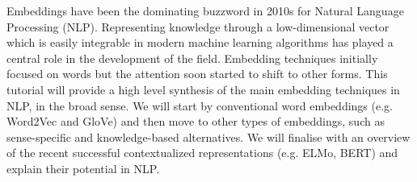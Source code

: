 Embeddings have been the dominating buzzword in 2010s for Natural Language Processing (NLP). Representing knowledge through a low-dimensional vector which is easily integrable in modern machine learning algorithms has played a central role in the development of the field. Embedding techniques initially focused on words but the attention soon started to shift to other forms. This tutorial will provide a high level synthesis of the main embedding techniques in NLP, in the broad sense. We will start by conventional word embeddings (e.g. Word2Vec and GloVe) and then move to other types of embeddings, such as sense-specific and knowledge-based alternatives. We will finalise with an overview of the recent successful contextualized representations (e.g. ELMo, BERT) and explain their potential in NLP.
